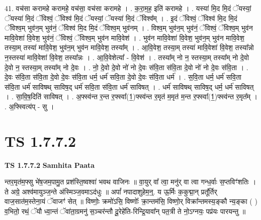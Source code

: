 \documentclass[17pt]{extarticle}
\begin{document}
41. वच॑सा करामहे करामहे॒ वच॑सा॒ वच॑सा करामहे । . क॒रा॒म॒ह॒ इति॑ करामहे । . यस्या॑ मि॒द मि॒दं ॅयस्यां॒ ॅयस्या॑ मि॒दं ॅविश्वं॒ ॅविश्व॑ मि॒दं ॅयस्यां॒ ॅयस्या॑ मि॒दं ॅविश्व᳚म् । . इ॒दं ॅविश्वं॒ ॅविश्व॑ मि॒द मि॒दं ॅविश्व॒म् भुव॑न॒म् भुव॑नं॒ ॅविश्व॑ मि॒द मि॒दं ॅविश्व॒म् भुव॑नम् । . विश्व॒म् भुव॑न॒म् भुव॑नं॒ ॅविश्वं॒ ॅविश्व॒म् भुव॑न मावि॒वेशा॑ वि॒वेश॒ भुव॑नं॒ ॅविश्वं॒ ॅविश्व॒म् भुव॑न मावि॒वेश॑ । . भुव॑न मावि॒वेशा॑ वि॒वेश॒ भुव॑न॒म् भुव॑न मावि॒वेश॒ तस्या॒म् तस्या॑ मावि॒वेश॒ भुव॑न॒म् भुव॑न मावि॒वेश॒ तस्या᳚म् । . आ॒वि॒वेश॒ तस्या॒म् तस्या॑ मावि॒वेशा॑ वि॒वेश॒ तस्या᳚न्नो न॒स्तस्या॑ मावि॒वेशा॑ वि॒वेश॒ तस्या᳚न्नः । . आ॒वि॒वेशेत्या᳚ - वि॒वेश॑ । . तस्या᳚म् नो न॒ स्तस्या॒म् तस्या᳚म् नो दे॒वो दे॒वो न॒ स्तस्या॒म् तस्या᳚म् नो दे॒वः । . नो॒ दे॒वो दे॒वो नो॑ नो दे॒वः स॑वि॒ता स॑वि॒ता दे॒वो नो॑ नो दे॒वः स॑वि॒ता । . दे॒वः स॑वि॒ता स॑वि॒ता दे॒वो दे॒वः स॑वि॒ता धर्म॒ धर्म॑ सवि॒ता दे॒वो दे॒वः स॑वि॒ता धर्म॑ । . स॒वि॒ता धर्म॒ धर्म॑ सवि॒ता स॑वि॒ता धर्म॑ साविषथ् साविष॒द् धर्म॑ सवि॒ता स॑वि॒ता धर्म॑ साविषत् । . धर्म॑ साविषथ् साविष॒द् धर्म॒ धर्म॑ साविषत् । . सा॒वि॒ष॒दिति॑ साविषत् । . अ॒फ्स्व॑न्त र॒न्त र॒फ्स्वा᳚(1॒)फ्स्व॑न्त र॒मृत॑ म॒मृत॑ म॒न्त र॒फ्स्वा᳚(1॒)फ्स्व॑न्त र॒मृत᳚म् । . अ॒फ्स्वित्य॑प् - सु । \newline
\pagebreak
{}

\section{ TS 1.7.7.2 }

\textbf{TS 1.7.7.2 } \newline
\textbf{Samhita Paata} \newline

न्तर॒मृत॑म॒फ्सु भे॑ष॒जम॒पामु॒त प्रश॑स्ति॒ष्वश्वा॑ भवथ वाजिनः ॥ वा॒युर् वा᳚ त्वा॒ मनु॑र् वा त्वा गन्ध॒र्वाः स॒प्तविꣳ॑शतिः । ते अग्रे॒ अश्व॑मायुञ्ज॒न्ते अ॑स्मिञ्ज॒वमाऽद॑धुः ॥ अपां᳚ नपादाशुहेम॒न्॒. य ऊ॒र्मिः क॒कुद्मा॒न् प्रतू᳚र्तिर् वाज॒सात॑म॒स्तेना॒यं ॅवाजꣳ॑ सेत् ॥ विष्णोः॒ क्रमो॑ऽसि॒ विष्णोः᳚ क्रा॒न्तम॑सि॒ विष्णो॒र् विक्रा᳚न्तमस्य॒ङ्कौ न्य॒ङ्का ( ) व॒भितो॒ रथं॒ ॅयौ ध्वा॒न्तं ॅवा॑ता॒ग्रमनु॑ स॒ञ्चर॑न्तौ दू॒रेहे॑ति-रिन्द्रि॒यावा᳚न् पत॒त्री ते नो॒ऽग्नयः॒ पप्र॑यः पारयन्तु ॥ \newline
\end{document}

